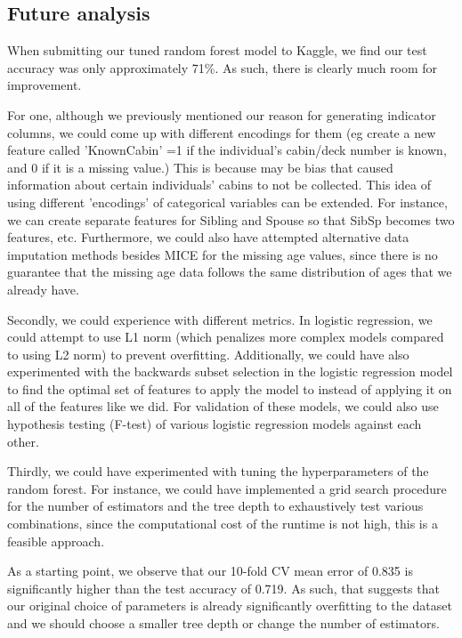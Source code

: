 \documentclass[12pt]{article}
\begin{document}
\subsection{Future analysis}
When submitting our tuned random forest model to Kaggle, we find our test accuracy was only approximately 71\%. As such, there is clearly much room for improvement.\newline

For one, although we previously mentioned our reason for generating indicator columns, we could come up with different encodings for them (eg create a new feature called 'KnownCabin' =1 if the individual's cabin/deck number is known, and 0 if it is a missing value.) This is because may be bias that caused information about certain individuals' cabins to not be collected. This idea of using different 'encodings' of categorical variables can be extended. For instance, we can create separate features for Sibling and Spouse so that SibSp becomes two features, etc. Furthermore, we could also have attempted alternative data imputation methods besides MICE for the missing age values, since there is no guarantee that the missing age data follows the same distribution of ages that we already have.\newline

Secondly, we could experience with different metrics. In logistic regression, we could attempt to use L1 norm (which penalizes more complex models compared to using L2 norm) to prevent overfitting. Additionally, we could have also experimented with the backwards subset selection in the logistic regression model to find the optimal set of features to apply the model to instead of applying it on all of the features like we did. For validation of these models, we could also use hypothesis testing (F-test) of various logistic regression models against each other.\newline

Thirdly, we could have experimented with tuning the hyperparameters of the random forest. For instance, we could have implemented a grid search procedure for the number of estimators and the tree depth to exhaustively test various combinations, since the computational cost of the runtime is not high, this is a feasible approach.\newline

As a starting point, we observe that our 10-fold CV mean error of 0.835 is significantly higher than the test accuracy of 0.719. As such, that suggests that our original choice of parameters is already significantly overfitting to the dataset and we should choose a smaller tree depth or change the number of estimators.\newline
\end{document}
